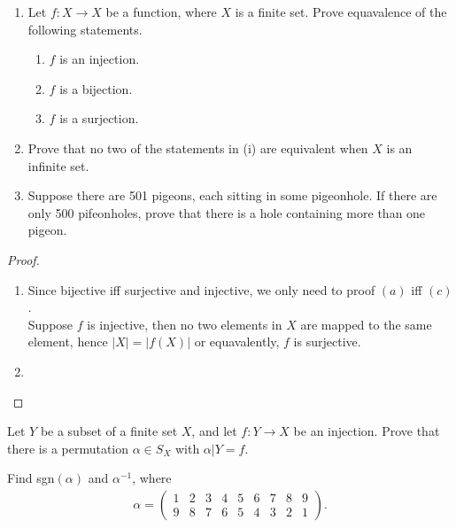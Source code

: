\documentclass[12pt]{article}
\newenvironment{exercise}[2][Exercise]{\begin{trivlist}
\item[\hskip \labelsep {\bfseries #1}\hskip \labelsep {\bfseries #2.}]}
{\end{trivlist}}
\begin{document}
\begin{exercise}{1.8 (Pigeonhole Principle)}
    \begin{enumerate}

        \item[(i)] Let $f:X\rightarrow X$ be a function, where $X$ is a finite set. Prove equavalence of the following statements.
        \begin{enumerate}
            \item[(a)] $f$ is an injection.
            \item[(b)] $f$ is a bijection.
            \item[(c)] $f$ is a surjection.
        \end{enumerate}

        \item[(ii)] Prove that no two of the statements in (i) are equivalent when $X$ is an infinite set.
        \item[(iii)] Suppose there are 501 pigeons, each sitting in some pigeonhole. If there are only 500 pifeonholes, prove that there is a hole containing more than one pigeon.
    \end{enumerate}
\end{exercise}

\begin{proof}

    \begin{enumerate}
        \item[(i)] Since bijective iff surjective and injective, we only need to proof $(a)$ iff $(c)$. \\
        Suppose $f$ is injective, then no two elements in $X$ are mapped to the same element, hence $|X|=|f(X)|$ or equavalently, $f$ is surjective.

        \item[(ii)]
    \end{enumerate}

\end{proof}





\begin{exercise}{1.9}

    Let $Y$ be a subset of a finite set $X$, and let $f:Y\rightarrow X$ be an injection. Prove that there is a permutation $\alpha \in S_X$ with $\alpha |Y =f$.

    
\end{exercise}


\begin{exercise}{1.10}

    Find sgn$(\alpha)$ and $\alpha^{-1}$, where 
    \begin{align*}
        \alpha = \begin{pmatrix}
            1&2&3&4&5&6&7&8&9\\9&8&7&6&5&4&3&2&1
        \end{pmatrix}.
    \end{align*}
    
\end{exercise}
\end{document}
